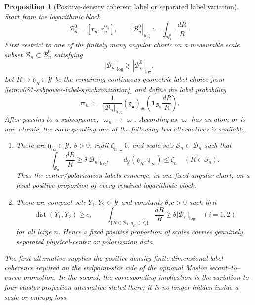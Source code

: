 \documentclass[10pt]{article}
\newtheorem{proposition}[theorem]{Proposition}
\newcommand{\dist}{\operatorname{dist}}
\begin{document}
\begin{proposition}[Positive-density coherent label or separated label variation]
\label{prop:v081-log-block-label-measure-dichotomy}
Start from the logarithmic block
\[
\mathcal B_n^0=[r_n,r_n^{\alpha_\eta}],
\qquad
|\mathcal B_n^0|_{\log}
:=
\int_{\mathcal B_n^0}\frac{dR}{R}.
\]
First restrict to one of the finitely many angular charts on a measurable scale subset
\(\mathcal B_n\subset\mathcal B_n^0\) satisfying
\[
|\mathcal B_n|_{\log}
\gtrsim
|\mathcal B_n^0|_{\log}.
\]
Let
\(R\mapsto\mathfrak y_R\in\mathcal Y\) be the remaining continuous geometric-label choice from
\cref{lem:v081-subpower-label-synchronization}, and define the label probability
\[
\varpi_n
:=
\frac1{|\mathcal B_n|_{\log}}
(\mathfrak y_\bullet)_\#
\left(\mathbf1_{\mathcal B_n}\frac{dR}{R}\right).
\]
After passing to a subsequence, \(\varpi_n\rightharpoonup\varpi\).  According as \(\varpi\) has
an atom or is non-atomic, the corresponding one of the following two alternatives is available.
\begin{enumerate}[label=\textnormal{(\roman*)}]
\item There are \(\mathfrak y_\infty\in\mathcal Y\), \(\theta>0\), radii
\(\zeta_n\downarrow0\), and scale sets \(\mathcal S_n\subset\mathcal B_n\) such that
\begin{equation}
\label{eq:v081-positive-density-label-atom}
\boxed{
\int_{\mathcal S_n}\frac{dR}{R}
\ge
\theta|\mathcal B_n|_{\log},
\qquad
d_{\mathcal Y}(\mathfrak y_R,\mathfrak y_\infty)
\le\zeta_n
\quad(R\in\mathcal S_n).
}
\end{equation}
Thus the center/polarization labels converge, in one fixed angular chart, on a fixed positive proportion of every
retained logarithmic block.
\item There are compact sets \(Y_1,Y_2\subset\mathcal Y\) and constants
\(\theta,c>0\) such that
\begin{equation}
\label{eq:v081-positive-density-label-variation}
\boxed{
\dist(Y_1,Y_2)\ge c,
\qquad
\int_{\{R\in\mathcal B_n:\mathfrak y_R\in Y_i\}}\frac{dR}{R}
\ge
\theta|\mathcal B_n|_{\log}
\quad(i=1,2)
}
\end{equation}
for all large \(n\).  Hence a fixed positive proportion of scales carries genuinely separated
physical-center or polarization data.
\end{enumerate}
The first alternative supplies the positive-density finite-dimensional label coherence required
on the endpoint-star side of
the optional Maslov secant--to--curve promotion.  In the second, the corresponding implication is
the variation-to-four-cluster projection alternative stated there; it is no longer hidden inside a
scale or entropy loss.
\end{proposition}
\end{document}
